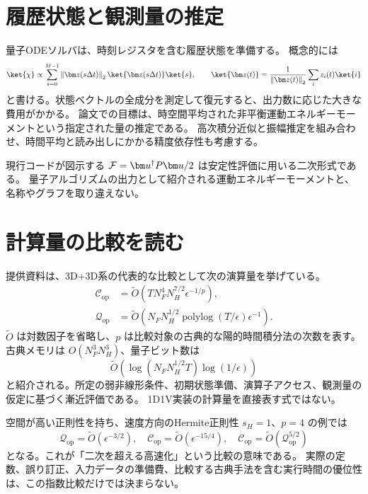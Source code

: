 \section{履歴状態と観測量の推定}
量子ODEソルバは、時刻レジスタを含む履歴状態を準備する。
概念的には
\begin{equation}
\ket{\chi}\propto\sum_{s=0}^{M-1}
\normtwo{\bm z(s\Delta t)}\ket{\bm z(s\Delta t)}\ket{s},
\qquad \ket{\bm z(t)}=\frac{1}{\normtwo{\bm z(t)}}\sum_i z_i(t)\ket{i}
\end{equation}
と書ける。状態ベクトルの全成分を測定して復元すると、出力数に応じた大きな費用がかかる。
論文での目標は、時空間平均された非平衡運動エネルギーモーメントという指定された量の推定である。
高次積分近似と振幅推定を組み合わせ、時間平均と読み出しにかかる精度依存性も考慮する。

\begin{notebox}
現行コードが図示する $\mathcal F=\uu^\dagger P\uu/2$ は安定性評価に用いる二次形式である。
量子アルゴリズムの出力として紹介される運動エネルギーモーメントと、名称やグラフを取り違えない。
\end{notebox}

\section{計算量の比較を読む}
提供資料は、3D+3D系の代表的な比較として次の演算量を挙げている。
\begin{align}
\mathcal C_{\mathrm{op}}&=\widetilde O\left(
T N_F^4N_H^{7/2}\epsilon^{-1/p}\right),\\
\mathcal Q_{\mathrm{op}}&=\widetilde O\left(
N_FN_H^{1/2}\operatorname{polylog}(T/\epsilon)\epsilon^{-1}\right).
\end{align}
$\widetilde O$ は対数因子を省略し、$p$ は比較対象の古典的な陽的時間積分法の次数を表す。
古典メモリは $O(N_F^3N_H^3)$、量子ビット数は
\[
\widetilde O\left(\log(N_FN_H^{1/2}T)\log(1/\epsilon)\right)
\]
と紹介される。所定の弱非線形条件、初期状態準備、演算子アクセス、観測量の仮定に基づく漸近評価である。
1D1V実装の計算量を直接表す式ではない。

空間が高い正則性を持ち、速度方向のHermite正則性 $s_H=1$、$p=4$ の例では
\[
\mathcal Q_{\mathrm{op}}=\widetilde O(\epsilon^{-3/2}),\quad
\mathcal C_{\mathrm{op}}=\widetilde O(\epsilon^{-15/4}),\quad
\mathcal C_{\mathrm{op}}=\widetilde O(\mathcal Q_{\mathrm{op}}^{5/2})
\]
となる。これが「二次を超える高速化」という比較の意味である。
実際の定数、誤り訂正、入力データの準備費、比較する古典手法を含む実行時間の優位性は、この指数比較だけでは決まらない。


